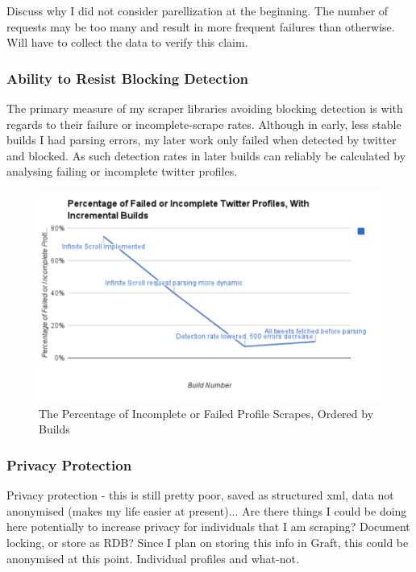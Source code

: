 Discuss why I did not consider parellization at the beginning. The number of requests may be too many and result in more frequent failures than otherwise. Will have to collect the data to verify this claim. 

\subsubsection{Ability to Resist Blocking Detection}

The primary measure of my scraper libraries avoiding blocking detection is with regards to their failure or incomplete-scrape rates. Although in early, less stable builds I had parsing errors, my later work only failed when detected by twitter and blocked. As such detection rates in later builds can reliably be calculated by analysing failing or incomplete twitter profiles. 

\begin{figure}[h!]
\centering
\includegraphics{Images/percentage_failed_incomplete_twitter_profiles.pdf}
\caption{The Percentage of Incomplete or Failed Profile Scrapes, Ordered by Builds}
\end{figure}

\subsubsection{Privacy Protection}

Privacy protection - this is still pretty poor, saved as structured xml, data not anonymised (makes my life easier at present)... Are there things I could be doing here potentially to increase privacy for individuals that I am scraping? Document locking, or store as RDB? Since I plan on storing this info in Graft, this could be anonymised at this point. Individual profiles and what-not. 


